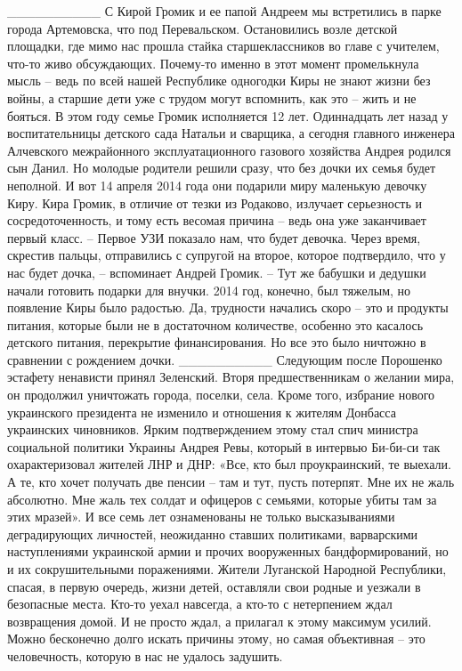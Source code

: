 __________
С Кирой Громик и ее папой Андреем мы встретились в парке города Артемовска, что под Перевальском. Остановились возле детской площадки, где мимо нас прошла стайка старшеклассников во главе с учителем, что-то живо обсуждающих. Почему-то именно в этот момент промелькнула мысль – ведь по всей нашей Республике одногодки Киры не знают жизни без войны, а старшие дети уже с трудом могут вспомнить, как это – жить и не бояться.
В этом году семье Громик исполняется 12 лет. Одиннадцать лет назад у воспитательницы детского сада Натальи и сварщика, а сегодня главного инженера Алчевского межрайонного эксплуатационного газового хозяйства Андрея родился сын Данил. Но молодые родители решили сразу, что без дочки их семья будет неполной. И вот 14 апреля 2014 года они подарили миру маленькую девочку Киру.
Кира Громик, в отличие от тезки из Родаково, излучает серьезность и сосредоточенность, и тому есть весомая причина – ведь она уже заканчивает первый класс.
– Первое УЗИ показало нам, что будет девочка. Через время, скрестив пальцы, отправились с супругой на второе, которое подтвердило, что у нас будет дочка, – вспоминает Андрей Громик. – Тут же бабушки и дедушки начали готовить подарки для внучки. 2014 год, конечно, был тяжелым, но появление Киры было радостью. Да, трудности начались скоро – это и продукты питания, которые были не в достаточном количестве, особенно это касалось детского питания, перекрытие финансирования. Но все это было ничтожно в сравнении с рождением дочки.
__________
Следующим после Порошенко эстафету ненависти принял Зеленский. Вторя предшественникам о желании мира, он продолжил уничтожать города, поселки, села. Кроме того, избрание нового украинского президента не изменило и отношения к жителям Донбасса украинских чиновников. Ярким подтверждением этому стал спич министра социальной политики Украины Андрея Ревы, который в интервью Би-би-си так охарактеризовал жителей ЛНР и ДНР: «Все, кто был проукраинский, те выехали. А те, кто хочет получать две пенсии – там и тут, пусть потерпят. Мне их не жаль абсолютно. Мне жаль тех солдат и офицеров с семьями, которые убиты там за этих мразей».
И все семь лет ознаменованы не только высказываниями деградирующих личностей, неожиданно ставших политиками, варварскими наступлениями украинской армии и прочих вооруженных бандформирований, но и их сокрушительными поражениями. Жители Луганской Народной Республики, спасая, в первую очередь, жизни детей, оставляли свои родные и уезжали в безопасные места. Кто-то уехал навсегда, а кто-то с нетерпением ждал возвращения домой. И не просто ждал, а прилагал к этому максимум усилий. Можно бесконечно долго искать причины этому, но самая объективная – это человечность, которую в нас не удалось задушить.
